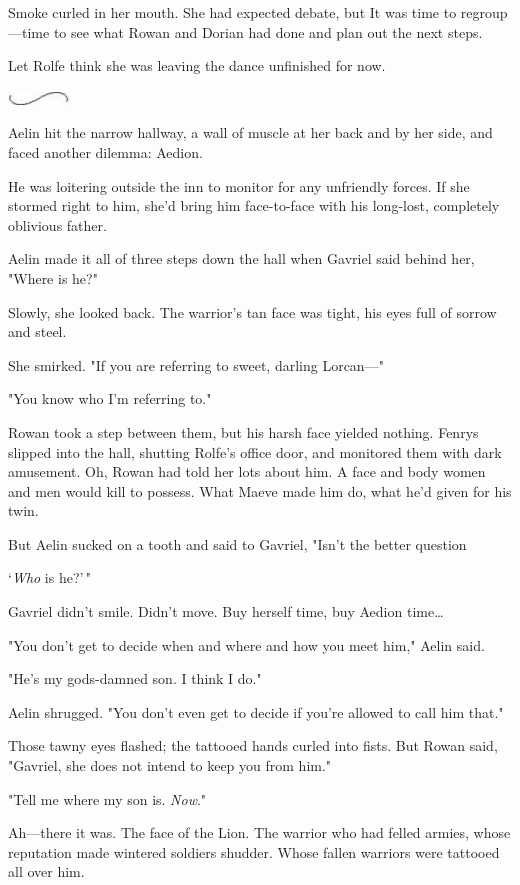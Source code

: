 Smoke curled in her mouth. She had expected debate, but  It was time to regroup---time to see what Rowan and Dorian had done and plan out the next steps.

Let Rolfe think she was leaving the dance unfinished for now.

\includegraphics[width=0.65in,height=0.13in]{images/seperator}

Aelin hit the narrow hallway, a wall of muscle at her back and by her side, and faced another dilemma: Aedion.

He was loitering outside the inn to monitor for any unfriendly forces. If she stormed right to him, she'd bring him face-to-face with his long-lost, completely oblivious father.

Aelin made it all of three steps down the hall when Gavriel said behind her, "Where is he?"

Slowly, she looked back. The warrior's tan face was tight, his eyes full of sorrow and steel.

She smirked. "If you are referring to sweet, darling Lorcan---"

"You know who I'm referring to."

Rowan took a step between them, but his harsh face yielded nothing. Fenrys slipped into the hall, shutting Rolfe's office door, and monitored them with dark amusement. Oh, Rowan had told her lots about him. A face and body women and men would kill to possess. What Maeve made him do, what he'd given for his twin.

But Aelin sucked on a tooth and said to Gavriel, "Isn't the better question

`\emph{Who} is he?'\,"

Gavriel didn't smile. Didn't move. Buy herself time, buy Aedion time\ldots{}

"You don't get to decide when and where and how you meet him," Aelin said.

"He's my gods-damned son. I think I do."

Aelin shrugged. "You don't even get to decide if you're allowed to call him that."

Those tawny eyes flashed; the tattooed hands curled into fists. But Rowan said, "Gavriel, she does not intend to keep you from him."

"Tell me where my son is. \emph{Now}."

Ah---there it was. The face of the Lion. The warrior who had felled armies, whose reputation made wintered soldiers shudder. Whose fallen warriors were tattooed all over him.

